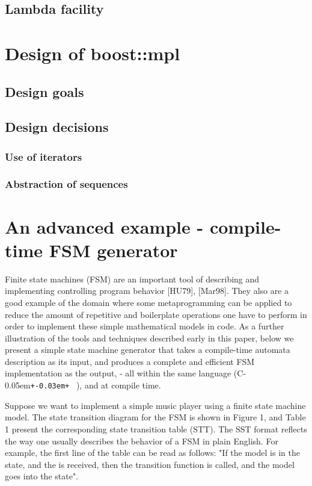 \documentclass{netobjectdays}
\newcommand{\Cpp}{C\kern-0.05em\texttt{+\kern-0.03em+}%
}
\newcommand{\mping}{meta\-program\-ming}
\begin{document}
\subsection{Lambda facility}

\section{Design of boost::mpl}
\subsection{Design goals}
\subsection{Design decisions}
\subsubsection{Use of iterators}
\subsubsection{Abstraction of sequences}

\section{An advanced example - compile-time FSM generator}

Finite state machines (FSM) are an important tool of 
describing and implementing controlling program behavior 
[HU79], [Mar98]. They also are a good example of the domain 
where some \mping{} can be applied to reduce the amount of 
repetitive and boilerplate operations one have to perform 
in order to implement these simple mathematical models in 
code. As a further illustration of the tools and techniques 
described early in this paper, below we present a simple 
state machine generator that takes a compile-time automata 
description as its input, and produces a complete and 
efficient FSM implementation as the output, - all within 
the same language (\Cpp\ ), and at compile time.

Suppose we want to implement a simple music player using a 
finite state machine model. The state transition diagram for 
the FSM is shown in Figure 1, and Table 1 present the 
corresponding state transition table (STT). The SST format 
reflects the way one usually describes the behavior of a FSM 
in plain English. For example, the first line of the table 
can be read as follows: "If the model is in the 
state, and the  is received, then the 
 transition function is called, and the model 
goes into the  state".
\end{document}
